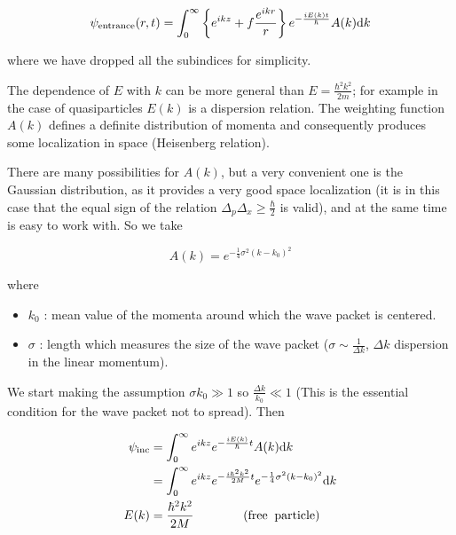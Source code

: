 \begin{equation}\label{eq2nd_1}
\psi_{\rm entrance}(r,t) = \int_0^{\infty} \left\{ e^{ikz} + f \frac{e^{ikr}}{r} \right\} e^{-\frac{i E(k) t}{\hbar}} A(k) {\rm d}k
\end{equation}

\noindent where we have dropped all the subindices for simplicity.

The dependence of $E$ with $k$ can be more general than $E=\frac{\hbar^2 k^2}{2m}$; for example in the case of quasiparticles $E(k)$ is a dispersion relation. The weighting function $A(k)$ defines a definite distribution of momenta and consequently produces some localization in space (Heisenberg relation).

There are many possibilities for $A(k)$, but a very convenient one is the Gaussian distribution, as it provides a very good space localization (it is in this case that the equal sign of the relation $\Delta_p \Delta_x \ge \frac{\hbar}{2}$ is valid), and at the same time is easy to work with. So we take

\begin{equation}
A(k) = e^{-\frac{1}{4} \sigma^2 (k-k_0)^2}
\end{equation}

\noindent where

\begin{itemize}
\item{$k_0$ : mean value of the momenta around which the wave packet is centered.}
\item{$\sigma$ : length which measures the size of the wave packet ($\sigma \sim \frac{1}{\Delta k}$, $\Delta k$ dispersion in the linear momentum).}
\end{itemize}

We start making the assumption $\sigma k_0 \gg 1$ so $\frac{\Delta k}{k_0} \ll 1$ (This is the essential condition for the wave packet not to spread). Then

\begin{equation}
\begin{split}
\psi_{\rm inc} &= \int_0^{\infty} e^{ikz} e^{-\frac{iE(k)}{\hbar}t} A(k) {\rm d}k \\
&= \int_0^{\infty} e^{ikz} e^{-\frac{i \hbar^2 k^2}{2M}t} e^{-\frac{1}{4}\sigma^2 (k-k_0)^2} {\rm d}k \\
E(k) &= \frac{\hbar^2 k^2}{2M} \qquad \qquad ({\rm free \;\; particle})
\end{split}
\end{equation}

